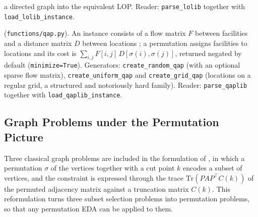 \documentclass[a4paper,11pt]{article}
\begin{document}
\begin{description}
    a directed graph into the equivalent LOP.  Reader: \texttt{parse\_lolib}
    together with \texttt{load\_lolib\_instance}.
  \item[\textbf{Quadratic Assignment Problem (QAP)}]
    (\texttt{functions/qap.py}).  An instance consists of a flow matrix $F$
    between facilities and a distance matrix $D$ between locations
    \citep{Koopmans_and_Beckmann:1957,Cela:1998}; a permutation assigns
    facilities to locations and its cost is
    $\sum_{i,j} F[i,j]\, D[\sigma(i), \sigma(j)]$, returned negated by default
    (\texttt{minimize=True}).  Generators: \texttt{create\_random\_qap} (with an
    optional sparse flow matrix), \texttt{create\_uniform\_qap} and
    \texttt{create\_grid\_qap} (locations on a regular grid, a structured and
    notoriously hard family).  Reader: \texttt{parse\_qaplib}
    \citep{Burkard_et_al:1997} together with \texttt{load\_qaplib\_instance}.
\end{description}

\subsection{Graph Problems under the Permutation Picture}

Three classical graph problems are included in the formulation of
\cite{Min:2024}, in which a permutation $\sigma$ of the vertices together with a
cut point $k$ encodes a subset of vertices, and the constraint is expressed
through the trace $\mathrm{Tr}(P A P^\top C(k))$ of the permuted adjacency matrix
against a truncation matrix $C(k)$.  This reformulation turns three subset
selection problems into permutation problems, so that any permutation EDA can be
applied to them.
\end{document}
